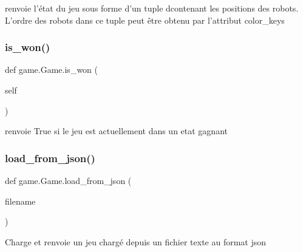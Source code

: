 \begin{DoxyVerb}renvoie l'état du jeu sous forme d'un tuple dcontenant les positions
des robots.
L'ordre des robots dans ce tuple peut être obtenu par l'attribut color_keys
\end{DoxyVerb}
 \mbox{\label{classgame_1_1Game_a0fc708c9734c5a42e3461188580efcd1}} 
\subsubsection{\texorpdfstring{is\+\_\+won()}{is\_won()}}
{\footnotesize\ttfamily def game.\+Game.\+is\+\_\+won (\begin{DoxyParamCaption}\item[{}]{self }\end{DoxyParamCaption})}

\begin{DoxyVerb}renvoie True si le jeu est actuellement dans un etat gagnant
\end{DoxyVerb}
 \mbox{\label{classgame_1_1Game_a60b7efdaf394c7f10a249eb7c539afe3}} 
\subsubsection{\texorpdfstring{load\+\_\+from\+\_\+json()}{load\_from\_json()}}
{\footnotesize\ttfamily def game.\+Game.\+load\+\_\+from\+\_\+json (\begin{DoxyParamCaption}\item[{}]{filename }\end{DoxyParamCaption})\hspace{0.3cm}{\ttfamily [static]}}

\begin{DoxyVerb}Charge et renvoie un jeu chargé depuis un fichier texte au format json
\end{DoxyVerb}
 \mbox{\label{classgame_1_1Game_a2d8234f8916943384bf5f756b616fe55}} 
